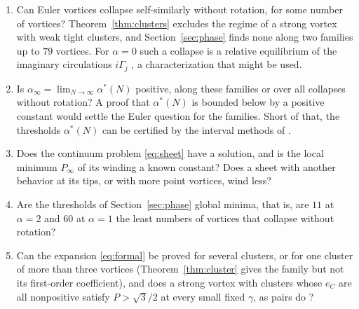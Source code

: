 \documentclass[11pt]{article}
\theoremstyle{definition}
\begin{document}
\begin{enumerate}
\item Can Euler vortices collapse self-similarly without rotation, for some number of vortices? Theorem~\ref{thm:clusters} excludes the regime of a strong vortex with weak tight clusters, and Section~\ref{sec:phase} finds none along two families up to $79$ vortices. For $\alpha = 0$ such a collapse is a relative equilibrium of the imaginary circulations $i\Gamma_j$ \cite[Sect.~10]{mw2026}, a characterization that might be used.
\item Is $\alpha_\infty = \lim_{N\to\infty}\alpha^*(N)$ positive, along these families or over all collapses without rotation? A proof that $\alpha^*(N)$ is bounded below by a positive constant would settle the Euler question for the families. Short of that, the thresholds $\alpha^*(N)$ can be certified by the interval methods of \cite{mw2026}.
\item Does the continuum problem \eqref{eq:sheet} have a solution, and is the local minimum $P_\infty$ of its winding a known constant? Does a sheet with another behavior at its tips, or with more point vortices, wind less?
\item Are the thresholds of Section~\ref{sec:phase} global minima, that is, are $11$ at $\alpha = 2$ and $60$ at $\alpha = 1$ the least numbers of vortices that collapse without rotation?
\item Can the expansion \eqref{eq:formal} be proved for several clusters, or for one cluster of more than three vortices (Theorem~\ref{thm:cluster} gives the family but not its first-order coefficient), and does a strong vortex with clusters whose $e_C$ are all nonpositive satisfy $P > \sqrt{3}/2$ at every small fixed $\gamma$, as pairs do \cite[Proposition~4]{mw2026}?
\end{enumerate}
\end{document}
